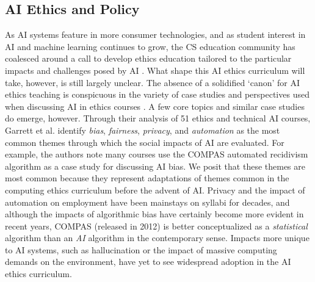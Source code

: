 \subsection*{AI Ethics and Policy}

As AI systems feature in more consumer technologies, and as student interest in AI and machine learning continues to grow, the CS education community has coalesced around a call to develop ethics education tailored to the particular impacts and challenges posed by AI \cite{burton_ethical_2017, furey_ai_2019, garrett_more_2020, borenstein_emerging_2021, raji_you_2021}. What shape this AI ethics curriculum will take, however, is still largely unclear. The absence of a solidified `canon' for AI ethics teaching is conspicuous in the variety of case studies and perspectives used when discussing AI in ethics courses \cite{weichert_eval}. A few core topics and similar case studies do emerge, however. Through their analysis of 51 ethics and technical AI courses, Garrett et al. \cite{garrett_more_2020} identify \textit{bias}, \textit{fairness}, \textit{privacy}, and \textit{automation} as the most common themes through which the social impacts of AI are evaluated. For example, the authors note many courses use the COMPAS automated recidivism algorithm \cite{larson_how_2016} as a case study for discussing AI bias. We posit that these themes are most common because they represent adaptations of themes common in the computing ethics curriculum before the advent of AI. Privacy and the impact of automation on employment have been mainstays on syllabi for decades, and although the impacts of algorithmic bias have certainly become more evident in recent years, COMPAS (released in 2012) is better conceptualized as a \textit{statistical} algorithm than an \textit{AI} algorithm in the contemporary sense. Impacts more unique to AI systems, such as hallucination or the impact of massive computing demands on the environment, have yet to see widespread adoption in the AI ethics curriculum.

